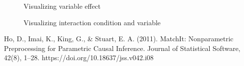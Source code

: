 \documentclass{article}
\begin{document}
\begin{figure}[H]
  \caption{Visualizing variable effect}
  \noindent{}
  \centering
\end{figure}

\begin{figure}[H]
  \caption{Visualizing interaction condition and variable}
  \noindent{}
  \centering
\end{figure}


Ho, D., Imai, K., King, G., \& Stuart, E. A. (2011). MatchIt: Nonparametric Preprocessing for Parametric Causal Inference. Journal of Statistical Software, 42(8), 1–28. https://doi.org/10.18637/jss.v042.i08
\end{document}
